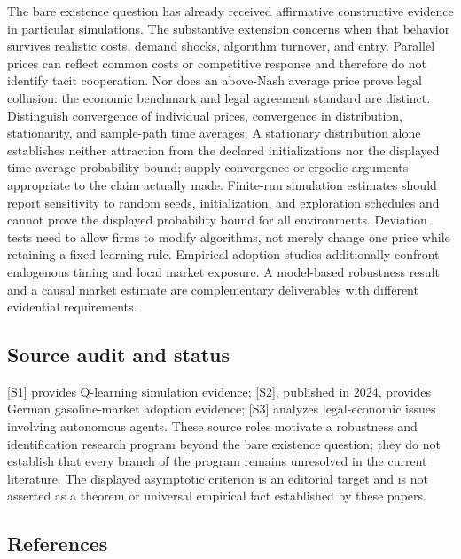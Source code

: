 \documentclass[11pt,a4paper]{article}
\begin{document}
The bare existence question has already received affirmative constructive evidence in particular simulations. The substantive extension concerns when that behavior survives realistic costs, demand shocks, algorithm turnover, and entry. Parallel prices can reflect common costs or competitive response and therefore do not identify tacit cooperation. Nor does an above-Nash average price prove legal collusion: the economic benchmark and legal agreement standard are distinct. Distinguish convergence of individual prices, convergence in distribution, stationarity, and sample-path time averages. A stationary distribution alone establishes neither attraction from the declared initializations nor the displayed time-average probability bound; supply convergence or ergodic arguments appropriate to the claim actually made. Finite-run simulation estimates should report sensitivity to random seeds, initialization, and exploration schedules and cannot prove the displayed probability bound for all environments. Deviation tests need to allow firms to modify algorithms, not merely change one price while retaining a fixed learning rule. Empirical adoption studies additionally confront endogenous timing and local market exposure. A model-based robustness result and a causal market estimate are complementary deliverables with different evidential requirements.

\subsection*{Source audit and status}

[S1] provides Q-learning simulation evidence; [S2], published in 2024, provides German gasoline-market adoption evidence; [S3] analyzes legal-economic issues involving autonomous agents. These source roles motivate a robustness and identification research program beyond the bare existence question; they do not establish that every branch of the program remains unresolved in the current literature. The displayed asymptotic criterion is an editorial target and is not asserted as a theorem or universal empirical fact established by these papers.

\subsection*{References}
\end{document}
